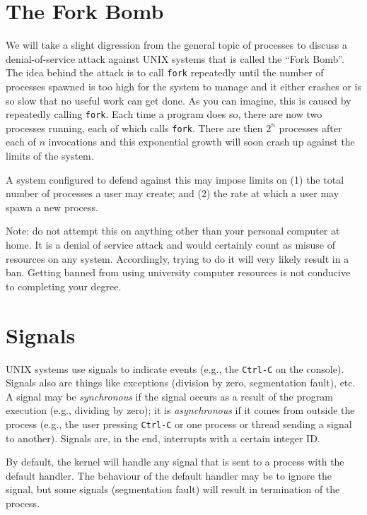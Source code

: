 \section*{The Fork Bomb}

We will take a slight digression from the general topic of processes to discuss a denial-of-service attack against UNIX systems that is called the ``Fork Bomb''. The idea behind the attack is to call \texttt{fork} repeatedly until the number of processes spawned is too high for the system to manage and it either crashes or is so slow that no useful work can get done. As you can imagine, this is caused by repeatedly calling \texttt{fork}. Each time a program does so, there are now two processes running, each of which calls \texttt{fork}. There are then $2^{n}$ processes after each of $n$ invocations and this exponential growth will soon crash up against the limits of the system.

A system configured to defend against this may impose limits on (1) the total number of processes a user may create; and (2) the rate at which a user may spawn a new process.

Note: do not attempt this on anything other than your personal computer at home. It is a denial of service attack and would certainly count as misuse of resources on any system. Accordingly, trying to do it will very likely result in a ban. Getting banned from using university computer resources is not conducive to completing your degree.


\section*{Signals}

UNIX systems use signals to indicate events (e.g., the \texttt{Ctrl-C} on the console). Signals also are things like exceptions (division by zero, segmentation fault), etc. A signal may be \textit{synchronous} if the signal occurs as a result of the program execution (e.g., dividing by zero); it is \textit{asynchronous} if it comes from outside the process (e.g., the user pressing \texttt{Ctrl-C} or one process or thread sending a signal to another). Signals are, in the end, interrupts with a certain integer ID.

By default, the kernel will handle any signal that is sent to a process with the default handler. The behaviour of the default handler may be to ignore the signal, but some signals (segmentation fault) will result in termination of the process.


